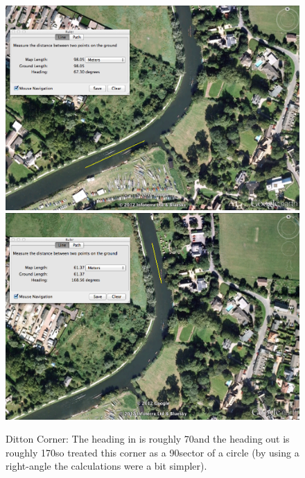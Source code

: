       \begin{figure}
      \begin{center}
        \includegraphics[scale=0.3]{images/DittonCornerHeadingIn.png}
        \includegraphics[scale=0.3]{images/DittonCornerHeadingOut.png}
        \caption{Ditton Corner: The heading in is roughly 70\textdegree and the heading out is roughly 170\textdegree so treated this corner as a 90\textdegree sector of a circle (by using a right-angle the calculations were a bit simpler).}
        \label{fig:dittoncorner:angle}
      \end{center}
      \end{figure}
      
